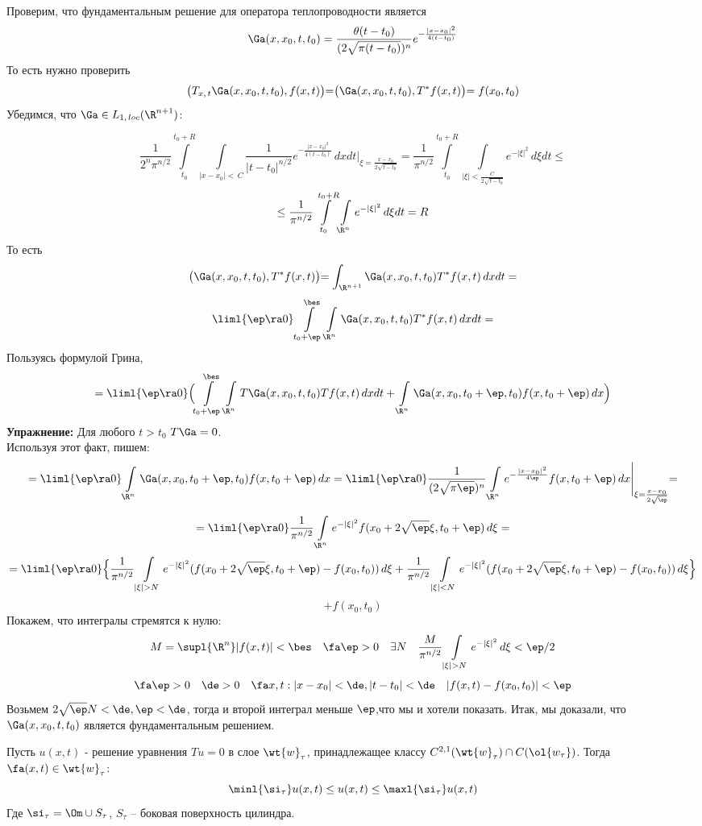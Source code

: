 \documentclass[a4paper,draft]{article}
\begin{document}
\noindent Проверим, что фундаментальным решение для оператора
теплопроводности является
$$
\Ga(x,x_0,t,t_0)=\frac {\theta(t-t_0)}{(2\sqrt{\pi(t-t_0)})^n}
e^{-\frac{|x-x_0|^2}{4(t-t_0)}}
$$
То есть нужно проверить
$$
\bigr(T_{x,\,t}
\Ga(x,x_0,t,t_0),f(x,t)\bigl)=\bigr(\Ga(x,x_0,t,t_0),T^*f(x,t)\bigl)=f(x_0,t_0)
$$
Убедимся, что $\Ga\in L_{1,\, loc}(\R^{n+1})$:

$$
\frac 1{2^n \pi ^{n/2}}
\int\limits_{t_0}^{t_0+R}\int\limits_{|x-x_0|<\,C} \frac
1{|t-t_0|^{n/2}}
e^{-\frac{|x-x_0|^2}{4(t-t_0)}}\,dxdt\Biggl|_{\xi=\frac{x-x_0}{2\sqrt{t-t_0}}}=\frac
1{\pi^{n/2}} \int\limits_{t_0}^{t_0+R}\int\limits_{|\xi|<\frac C
{2\sqrt{t-t_0}}} e^{-|\xi|^2}\,d\xi dt\le
$$
$$
\le \frac 1{\pi^{n/2}}
\int\limits_{t_0}^{t_0+R}\int\limits_{\R^n}
e^{-|\xi|^2}\,d\xi dt=R
$$
То есть
$$
\bigr(\Ga(x,x_0,t,t_0),T^*f(x,t)\bigl)=\int_{\R^{n+1}}
\Ga(x,x_0,t,t_0)T^*f(x,t)\,dx dt=
$$
$$
\liml{\ep\ra 0}
\int\limits_{t_0+\ep}^{\bes}\int\limits_{\R^n}\Ga(x,x_0,t,t_0)T^*f(x,t)\,dx dt=
$$
Пользуясь формулой Грина,
$$
=\liml{\ep\ra 0}\Bigl(
\int\limits_{t_0+\ep}^{\bes}\int\limits_{\R^n}T\Ga(x,x_0,t,t_0)T f(x,t)\,dx dt+ \int\limits_{\R^n}\Ga(x,x_0,t_0+\ep,t_0)f(x,t_0+\ep)\,dx\Bigl)
$$
\textbf{Упражнение:} Для любого $t>t_0$ $T\Ga=0$.\\
Используя этот факт, пишем:
$$
=\liml{\ep\ra 0} \int\limits_{\R^n}\Ga(x,x_0,t_0+\ep,t_0)f(x,t_0+\ep)\,dx=\liml{\ep\ra
0} \frac 1{(2\sqrt{\pi\ep})^n} \int\limits_{\R^n}
e^{-\frac{|x-x_0|^2}{4\ep}}
f(x,t_0+\ep)\,dx\Biggl|_{\xi=\frac{x-x_0}{2\sqrt\ep}}=
$$

$$
=\liml{\ep\ra 0} \frac
1{\pi^{n/2}}\int\limits_{\R^n}e^{-|\xi|^2}f(x_0+2\sqrt\ep\xi,t_0+\ep)\,d\xi=
$$
$$
=\liml{\ep\ra 0} \Bigl\{ \frac
1{\pi^{n/2}}\int\limits_{|\xi|>N}e^{-|\xi|^2}(f(x_0+2\sqrt\ep\xi,t_0+\ep)-f(x_0,t_0))\,d\xi+\frac
1{\pi^{n/2}}
\int\limits_{|\xi|<N}e^{-|\xi|^2}(f(x_0+2\sqrt\ep\xi,t_0+\ep)-f(x_0,t_0))\,d\xi
\Bigr\}
$$
$$
+f(x_0,t_0)
$$
Покажем, что интегралы стремятся к нулю:
$$
M=\supl{\R^n} |f(x,t)|<\bes \quad
\fa\ep>0\quad \exists N \quad \frac
M{\pi^{n/2}}\int\limits_{|\xi|>N}e^{-|\xi|^2}\,d\xi<\ep/2
$$
$$
\fa\ep>0\quad \de>0\quad \fa x,t:
|x-x_0|<\de,|t-t_0|<\de\quad |f(x,t)-f(x_0,t_0)|<\ep
$$
Возьмем $2\sqrt\ep N<\de,\ep<\de$, тогда и
второй интеграл меньше $\ep$,что мы и хотели показать.
Итак, мы доказали, что $\Ga(x,x_0,t,t_0)$ является
фундаментальным решением.

\begin{theorem}
Пусть $u(x,t)$ - решение уравнения $Tu=0$ в слое $\wt{w}_\tau$,
принадлежащее классу $C^{2,1}(\wt{w}_\tau)\cap C(\ol{
w_\tau})$.  Тогда $\fa (x,t)\in \wt{w}_\tau$:
$$
\minl{\si_\tau} u(x,t)\le u(x,t)\le \maxl{\si_\tau} u(x,t)
$$
Где $\si_\tau=\Om\cup S_\tau$, $S_\tau$ -- боковая
поверхность цилиндра.
\end{theorem}
\end{document}
